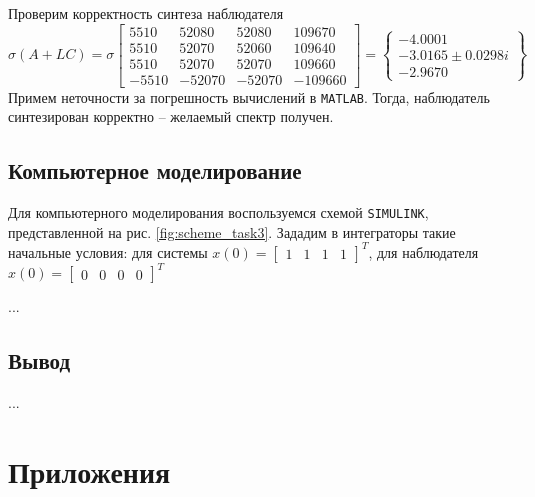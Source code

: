 \documentclass[a4paper, 12pt]{article}
\begin{document}
    Проверим корректность синтеза наблюдателя
    $$
    \sigma\left(A+LC\right)=\sigma\begin{bmatrix}
 5510	 &52080	 &52080	 &109670\\
 5510	 &52070	 &52060	 &109640\\
 5510	 &52070	 &52070	 &109660\\
-5510	&-52070	&-52070	&-109660
    \end{bmatrix}=\left\{\begin{matrix}
-4.0001\\
-3.0165\pm 0.0298i\\
-2.9670
    \end{matrix}\right\}
    $$
    Примем неточности за погрешность вычислений в \texttt{MATLAB}. Тогда, наблюдатель синтезирован корректно
    -- желаемый спектр получен.


    \subsection{Компьютерное моделирование}
    Для компьютерного моделирования воспользуемся схемой \texttt{SIMULINK},
    представленной на рис. \ref{fig:scheme_task3}. Зададим в интеграторы
    такие начальные условия: для системы $x(0)=\begin{bmatrix}
        1 &1 &1 &1
    \end{bmatrix}^T$, для наблюдателя $\hat{x}(0)=\begin{bmatrix}
        0 &0 &0 &0
    \end{bmatrix}^T$

    
    ...


    \subsection{Вывод}
    ...


    \section{Приложения}
\end{document}
